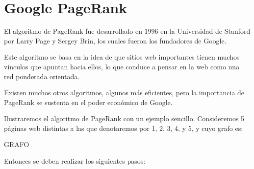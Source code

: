 \chapter{Google PageRank}

El algoritmo de PageRank fue desarrollado en 1996 en la Universidad de Stanford por Larry Page y Sergey Brin, los cuales fueron los fundadores de Google.

Este algoritmo se basa en la idea de que sitios web importantes tienen muchos vínculos que apuntan hacia ellos, lo que conduce a pensar en la web como una red ponderada orientada.

Existen muchos otros algoritmos, algunos más eficientes, pero la importancia de PageRank se sustenta en el poder económico de Google.

Ilustraremos el algoritmo de PageRank con un ejemplo sencillo. Consideremos 5 páginas web distintas a las que denotaremos por 1, 2, 3, 4, y 5, y cuyo grafo es:

\color{red} GRAFO \color{black}

Entonces se deben realizar los siguientes pasos:

